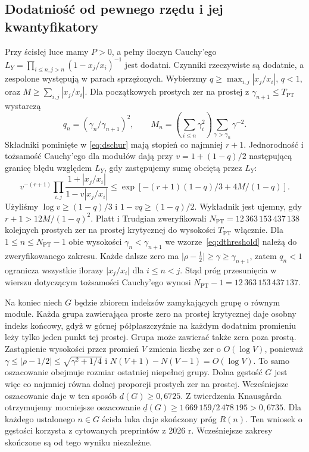 \documentclass[11pt,a4paper,reqno]{amsart}
\numberwithin{equation}{section}
\begin{document}
\subsection{Dodatniość od pewnego rzędu i jej kwantyfikatory}
Przy ścisłej luce mamy \(P>0\), a pełny iloczyn Cauchy'ego \(L_Y=\prod_{i\le n,j>n}(1-x_j/x_i)^{-1}\) jest dodatni. Czynniki rzeczywiste są dodatnie, a zespolone występują w parach sprzężonych. Wybierzmy \(q\ge\max_{i,j}|x_j/x_i|\), \(q<1\), oraz \(M\ge\sum_{i,j}|x_j/x_i|\). Dla początkowych prostych zer na prostej z \(\gamma_{n+1}\le T_{\mathrm{PT}}\) wystarczą
\begin{equation}\label{eq:dthreshold}
 q_n=(\gamma_n/\gamma_{n+1})^2,\qquad
 M_n=\left(\sum_{i\le n}\gamma_i^2\right)\sum_{\gamma>\gamma_n}\gamma^{-2}.
\end{equation}
Składniki pominięte w \eqref{eq:dschur} mają stopień co najmniej \(r+1\). Jednorodność i tożsamość Cauchy'ego dla modułów dają przy \(v=1+(1-q)/2\) następującą granicę błędu względem \(L_Y\), gdy zastępujemy sumę obciętą przez \(L_Y\):
\[
 v^{-(r+1)}\prod_{i,j}\frac{1+|x_j/x_i|}{1-v|x_j/x_i|}
 \le \exp\!\left[-(r+1)(1-q)/3+4M/(1-q)\right].
\]
Użyliśmy \(\log v\ge(1-q)/3\) i \(1-vq\ge(1-q)/2\). Wykładnik jest ujemny, gdy \(r+1>12M/(1-q)^2\). Platt i Trudgian \cite[twierdzenie~1 i \S2]{pt} zweryfikowali \(N_{\mathrm{PT}}=12\,363\,153\,437\,138\) kolejnych prostych zer na prostej krytycznej do wysokości \(T_{\mathrm{PT}}\) włącznie. Dla \(1\le n\le N_{\mathrm{PT}}-1\) obie wysokości \(\gamma_n<\gamma_{n+1}\) we wzorze~\eqref{eq:dthreshold} należą do zweryfikowanego zakresu. Każde dalsze zero ma \(\lvert\rho-\tfrac12\rvert\ge\gamma\ge\gamma_{n+1}\), zatem \(q_n<1\) ogranicza wszystkie ilorazy \(\lvert x_j/x_i\rvert\) dla \(i\le n<j\). Stąd próg przesunięcia w wierszu dotyczącym tożsamości Cauchy'ego wynosi \(N_{\mathrm{PT}}-1=12\,363\,153\,437\,137\).

Na koniec niech \(G\) będzie zbiorem indeksów zamykających grupę o równym module. Każda grupa zawierająca proste zero na prostej krytycznej daje osobny indeks końcowy, gdyż w górnej półpłaszczyźnie na każdym dodatnim promieniu leży tylko jeden punkt tej prostej. Grupa może zawierać także zera poza prostą. Zastąpienie wysokości przez promień \(V\) zmienia liczbę zer o \(O(\log V)\), ponieważ \(\gamma\le|\rho-1/2|\le\sqrt{\gamma^2+1/4}\) i \(N(V+1)-N(V-1)=O(\log V)\). To samo oszacowanie obejmuje rozmiar ostatniej niepełnej grupy. Dolna gęstość \(G\) jest więc co najmniej równa dolnej proporcji prostych zer na prostej. Wcześniejsze oszacowanie \cite{af,lam} daje w ten sposób \(\underline d(G)\ge0{,}6725\). Z twierdzenia Knausgårda \cite[twierdzenie~1.3]{knausgard} otrzymujemy mocniejsze oszacowanie \(\underline d(G)\ge 1\,669\,159/2\,478\,195>0{,}6735\). Dla każdego ustalonego \(n\in G\) ścisła luka daje skończony próg \(R(n)\). Ten wniosek o gęstości korzysta z cytowanych preprintów z 2026 r. Wcześniejsze zakresy skończone są od tego wyniku niezależne.
\end{document}
